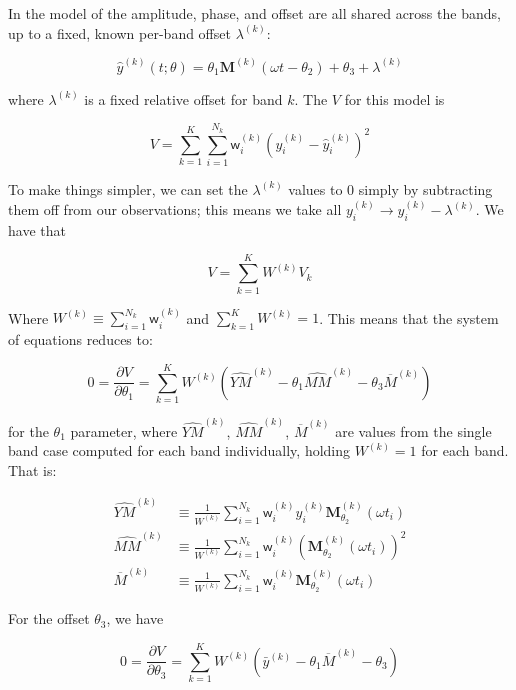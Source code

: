 \documentclass[apj]{emulateapj}
\newcommand{\wgt}{\mathsf{w}}  %
\newcommand{\MMhat}{\widehat{MM}}
\newcommand{\YMhat}{\widehat{YM}}
\newcommand{\Mbar}{\overline{M}}
\newcommand{\ybar}{\bar{y}}
\newcommand{\Mbk}[1][k]{\Mbar^{(#1)}}
\newcommand{\Mt}{\mathbf{M}}
\newcommand{\Mtshft}{\Mt_{\theta_2}}
\newcommand{\YMh}[1][k]{\YMhat^{(#1)}}
\newcommand{\MMh}[1][k]{\MMhat^{(#1)}}
\newcommand{\yb}[1][k]{\ybar^{(#1)}}
\newcommand{\wk}[1][k]{\wgt^{(#1)}}
\newcommand{\yhk}[1][k]{\hat{y}^{(#1)}}
\newcommand{\yk}[1][k]{y^{(#1)}}
\newcommand{\Mtshftk}[1][k]{\Mtshft^{(#1)}}
\newcommand{\Mtk}[1][k]{\Mt^{(#1)}}
\newcommand{\lk}[1][k]{\lambda^{(#1)}}
\newcommand{\Wtk}[1][k]{W^{(#1)}}
\begin{document}
\begin{appendix}
In the model of \cite{Sesar_etal_2016} the amplitude, phase, and offset are all shared across the bands, up to a fixed, known per-band offset $\lk$:

\begin{equation}
\yhk(t;\theta) = \theta_1\Mtk(\omega t - \theta_2) + \theta_3 + \lk
\end{equation}

where $\lk$ is a fixed relative offset for band $k$. The $V$ for this model is

\begin{equation}
V = \sum_{k=1}^{K}\sum_{i=1}^{N_k}\wk_i \left(\yk_i - \yhk_i\right)^2
\end{equation}

To make things simpler, we can set the $\lk$ values to 0 simply by subtracting them off from our observations; this means we take all $\yk_i \rightarrow \yk_i - \lk$. We have that

\begin{equation}
V = \sum_{k=1}^K \Wtk V_k
\end{equation}

Where $\Wtk \equiv \sum_{i=1}^{N_k}\wk_i$ and $\sum_{k=1}^K\Wtk = 1$. This means that the system of equations reduces to:

\begin{equation}
0 = \frac{\partial V}{\partial\theta_1} = \sum_{k=1}^K \Wtk\left(\YMh - \theta_1\MMh - \theta_3\Mbk\right)
\end{equation}

for the $\theta_1$ parameter, where $\YMh$, $\MMh$, $\Mbk$ are values from the single band case computed for each band individually, holding $\Wtk = 1$ for each band. That is:

\begin{align}
\YMh &\equiv \frac{1}{\Wtk}\sum_{i=1}^{N_k}\wk_i \yk_i \Mtshftk(\omega t_i)\\
\MMh &\equiv \frac{1}{\Wtk}\sum_{i=1}^{N_k}\wk_i \left(\Mtshftk(\omega t_i)\right)^2\\
\Mbk &\equiv \frac{1}{\Wtk}\sum_{i=1}^{N_k}\wk_i \Mtshftk(\omega t_i)
\end{align}

For the offset $\theta_3$, we have

\begin{equation}
0 = \frac{\partial V}{\partial\theta_3} = \sum_{k=1}^K \Wtk\left(\yb - \theta_1\Mbk - \theta_3\right)
\end{equation}


\end{appendix}
\end{document}
